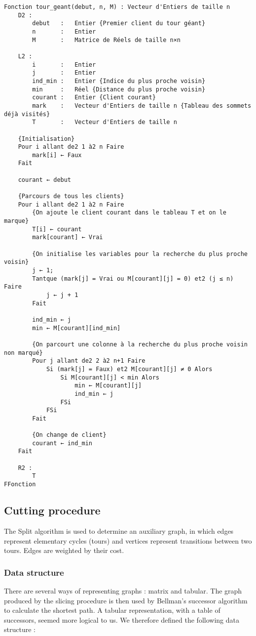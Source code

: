 \begin{lstlisting}[language=pseudo, caption={Tour géant}, label=tour_geant]
Fonction tour_geant(debut, n, M) : Vecteur d'Entiers de taille n
	D2 :
		debut	:	Entier {Premier client du tour géant}
		n		:	Entier
		M		:	Matrice de Réels de taille n×n

	L2 :
		i		:	Entier
		j		:	Entier
		ind_min	:	Entier {Indice du plus proche voisin}
		min		:	Réel {Distance du plus proche voisin}
		courant	:	Entier {Client courant}
		mark	:	Vecteur d'Entiers de taille n {Tableau des sommets déjà visités}
		T		:	Vecteur d'Entiers de taille n

	{Initialisation}
	Pour i allant de2 1 à2 n Faire
		mark[i] ← Faux
	Fait

	courant ← debut

	{Parcours de tous les clients}
	Pour i allant de2 1 à2 n Faire
		{On ajoute le client courant dans le tableau T et on le marque}
		T[i] ← courant
		mark[courant] ← Vrai

		{On initialise les variables pour la recherche du plus proche voisin}
		j ← 1;
		Tantque (mark[j] = Vrai ou M[courant][j] = 0) et2 (j ≤ n) Faire
			j ← j + 1
		Fait

		ind_min ← j
		min ← M[courant][ind_min]

		{On parcourt une colonne à la recherche du plus proche voisin non marqué}
		Pour j allant de2 2 à2 n+1 Faire
			Si (mark[j] = Faux) et2 M[courant][j] ≠ 0 Alors
				Si M[courant][j] < min Alors
					min ← M[courant][j]
					ind_min ← j
				FSi
			FSi
		Fait

		{On change de client}
		courant ← ind_min
	Fait

	R2 :
		T
FFonction
\end{lstlisting}

\subsection{Cutting procedure}

The Split algorithm is used to determine an auxiliary graph, in which edges represent elementary cycles (tours) and vertices represent transitions between two tours. Edges are weighted by their cost.

\subsubsection{Data structure}

There are several ways of representing graphs : matrix and tabular. The graph produced by the slicing procedure is then used by Bellman's successor algorithm to calculate the shortest path. A tabular representation, with a table of successors, seemed more logical to us. We therefore defined the following data structure :

